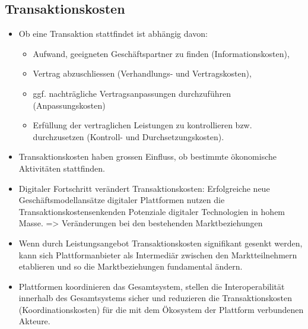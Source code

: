 \subsection{Transaktionskosten}
\begin{itemize}
	\item Ob eine Transaktion stattfindet ist abhängig davon:
	\begin{itemize}
		\item Aufwand, geeigneten Geschäftspartner zu finden (Informationskosten),
		\item Vertrag abzuschliessen (Verhandlungs- und Vertragskosten),
		\item ggf. nachträgliche Vertragsanpassungen durchzuführen (Anpassungskosten)
		\item Erfüllung der vertraglichen Leistungen zu kontrollieren bzw. durchzusetzen (Kontroll- und Durchsetzungskosten).
	\end{itemize}
	\item Transaktionskosten haben grossen Einfluss, ob bestimmte ökonomische Aktivitäten stattfinden.
	\item Digitaler Fortschritt verändert Transaktionskosten: Erfolgreiche neue Geschäftsmodellansätze digitaler Plattformen nutzen die Transaktionskostensenkenden Potenziale digitaler Technologien in hohem Masse. => Veränderungen bei den bestehenden Marktbeziehungen
	\item Wenn durch Leistungsangebot Transaktionskosten signifikant gesenkt werden, kann sich Plattformanbieter als Intermediär zwischen den Marktteilnehmern etablieren und so die Marktbeziehungen fundamental ändern.
	\item Plattformen koordinieren das Gesamtsystem, stellen die Interoperabilität innerhalb des Gesamtsystems sicher und reduzieren die Transaktionskosten (Koordinationskosten) für die mit dem Ökosystem der Plattform verbundenen Akteure.
\end{itemize}

